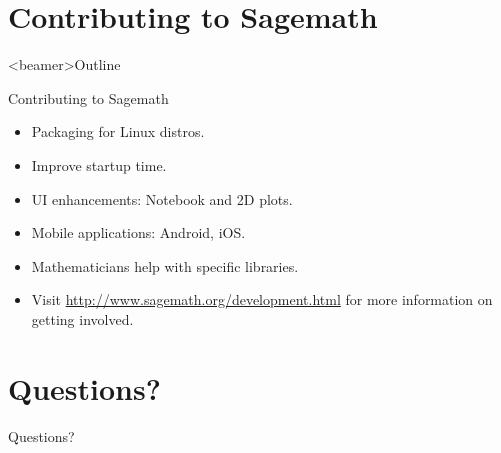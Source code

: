 \documentclass{beamer}
\begin{document}
\section{Contributing to Sagemath}
\begin{frame}<beamer>{Outline}
    \tableofcontents[currentsection, sectionstyle=show/shaded]
\end{frame}

\begin{frame}{Contributing to Sagemath}
 \begin{itemize}
  \item Packaging for Linux distros.
  \item Improve startup time.
  \item UI enhancements: Notebook and 2D plots.
  \item Mobile applications: Android, iOS.
  \item Mathematicians help with specific libraries.
  \item Visit \href{http://www.sagemath.org/development.html}{http://www.sagemath.org/development.html} for more information on getting involved.
 \end{itemize}
\end{frame}

\section{Questions?}
\begin{frame}
  \begin{center}
    \HUGE Questions?
  \end{center}
\end{frame}
\end{document}
